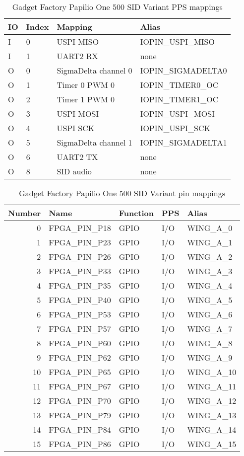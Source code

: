 \documentclass[12pt,a4paper,openany,smallheadings,headinclude,headsepline,final]{scrreprt}
\def \board {Gadget Factory Papilio One 500 SID Variant }
\begin{document}
\begin{table}[H]
\begin{center}
\begin{tabularx}{14cm}{lllX}

IO & Index & Mapping & Alias \\
\hline
I & 0 & USPI MISO & IOPIN\_USPI\_MISO \\
I & 1 & UART2 RX & none \\
O & 0 & SigmaDelta channel 0 & IOPIN\_SIGMADELTA0 \\
O & 1 & Timer 0 PWM 0 &  IOPIN\_TIMER0\_OC \\
O & 2 & Timer 1 PWM 0 & IOPIN\_TIMER1\_OC \\
O & 3 & USPI MOSI & IOPIN\_USPI\_MOSI \\
O & 4 & USPI SCK & IOPIN\_USPI\_SCK \\
O & 5 & SigmaDelta channel 1 & IOPIN\_SIGMADELTA1 \\
O & 6 & UART2 TX & none \\
O & 8 & SID audio & none \\
\end{tabularx}
\caption{\board PPS mappings}
\end{center}
\end{table}



\begin{table}[H]
\begin{center}
\begin{tabularx}{14cm}{rlllX}
Number & Name & Function & PPS & Alias \\
\hline

0 & FPGA\_PIN\_P18 & GPIO & I/O & WING\_A\_0 \\
1 & FPGA\_PIN\_P23 & GPIO & I/O & WING\_A\_1 \\
2 & FPGA\_PIN\_P26  & GPIO & I/O & WING\_A\_2 \\
3 & FPGA\_PIN\_P33  & GPIO & I/O & WING\_A\_3 \\
4 & FPGA\_PIN\_P35  & GPIO & I/O & WING\_A\_4 \\
5 & FPGA\_PIN\_P40  & GPIO & I/O & WING\_A\_5 \\
6 & FPGA\_PIN\_P53  & GPIO & I/O & WING\_A\_6 \\
7 & FPGA\_PIN\_P57  & GPIO & I/O & WING\_A\_7 \\
8 & FPGA\_PIN\_P60  & GPIO & I/O & WING\_A\_8 \\
9 & FPGA\_PIN\_P62  & GPIO & I/O & WING\_A\_9 \\
10 & FPGA\_PIN\_P65 & GPIO & I/O & WING\_A\_10 \\
11 & FPGA\_PIN\_P67 & GPIO & I/O & WING\_A\_11 \\
12 & FPGA\_PIN\_P70 & GPIO & I/O & WING\_A\_12 \\
13 & FPGA\_PIN\_P79 & GPIO & I/O & WING\_A\_13 \\
14 & FPGA\_PIN\_P84 & GPIO & I/O & WING\_A\_14 \\
15 & FPGA\_PIN\_P86 & GPIO & I/O & WING\_A\_15
\end{tabularx}
\caption{\board pin mappings}
\end{center}
\end{table}
\end{document}
